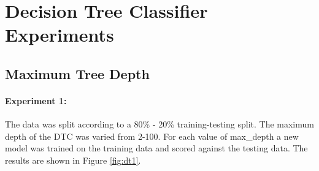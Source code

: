 \documentclass[12pt, letterpaper]{article}
\begin{document}
\section{Decision Tree Classifier Experiments}

\subsection{Maximum Tree Depth}

\paragraph*{Experiment 1:} The data was split according to a 80\% - 20\%
training-testing split. The maximum depth of the DTC was varied from 2-100.
For each value of max\_depth a new model was trained on the training data and 
scored against the testing data. The results are shown in Figure \ref{fig:dt1}.
\end{document}
